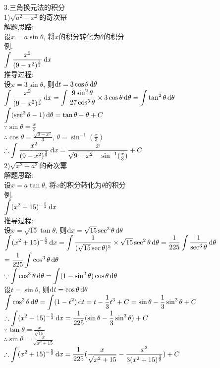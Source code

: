 3.三角换元法的积分\\
1)$\sqrt{a^2-x^2}$的奇次幂\\
解题思路:\\
设$x=a\sin\theta$, 将$x$的积分转化为$\theta$的积分\\
例.\\
\phantom{例}$\displaystyle\int\frac{x^2}{(9-x^2)^{\frac{3}{2}}}\mathop{}\!\mathrm{d} x$\\
推导过程:\\
设$x=3\sin\theta$, 则$\mathop{}\!\mathrm{d} t=3\cos\theta\mathop{}\!\mathrm{d}\theta$\\
$\displaystyle\int\frac{x^2}{(9-x^2)^{\frac{3}{2}}}\mathop{}\!\mathrm{d} x=\int\frac{9\sin^2\theta}{27\cos^3\theta}\times3\cos\theta\mathop{}\!\mathrm{d}\theta=\int\tan^2\theta\mathop{}\!\mathrm{d}\theta$\\
$\displaystyle\int(\sec^2\theta-1)\mathop{}\!\mathrm{d}\theta=\tan\theta-\theta+C$\\
$\displaystyle\because\sin\theta=\frac{x}{3}$\\
$\displaystyle\therefore\cos\theta=\frac{\sqrt{9-x^2}}{3}$, $\theta=\sin^{-1}(\frac{x}{3})$\\
$\displaystyle\therefore\int\frac{x^2}{(9-x^2)^{\frac{3}{2}}}\mathop{}\!\mathrm{d} x=\frac{x}{\sqrt{9-x^2}-\sin^{-1}(\frac{x}{3})}+C$\\

2)$\sqrt{x^2+a^2}$的奇次幂\\
解题思路:\\
设$x=a\tan\theta$, 将$x$的积分转化为$\theta$的积分\\
例.\\
\phantom{例}$\displaystyle\int(x^2+15)^{-\frac{5}{2}}\mathop{}\!\mathrm{d} x$\\
推导过程:\\
设$x=\sqrt{15}\tan\theta$, 则$\mathop{}\!\mathrm{d} x=\sqrt{15}\sec^2\theta\mathop{}\!\mathrm{d}\theta$\\
$\displaystyle\int(x^2+15)^{-\frac{5}{2}}\mathop{}\!\mathrm{d} x=\int\frac{1}{(\sqrt{15}\sec\theta)^5}\times\sqrt{15}\sec^2\theta\mathop{}\!\mathrm{d}\theta=\frac{1}{225}\int\frac{1}{\sec^3\theta}\mathop{}\!\mathrm{d}\theta$\\
$\displaystyle=\frac{1}{225}\int\cos^3\theta\mathop{}\!\mathrm{d}\theta$\\
$\displaystyle\because\int\cos^3\theta\mathop{}\!\mathrm{d}\theta=\int(1-\sin^2\theta)\cos\theta\mathop{}\!\mathrm{d}\theta$\\
\phantom{$\displaystyle\because$}设$t=\sin\theta$, 则$\mathop{}\!\mathrm{d} t=\cos\theta\mathop{}\!\mathrm{d}\theta$\\
\phantom{$\displaystyle\because$}$\displaystyle\int\cos^3\theta\mathop{}\!\mathrm{d}\theta=\int(1-t^2)\mathop{}\!\mathrm{d} t=t-\frac{1}{3}t^3+C=\sin\theta-\frac{1}{3}\sin^3\theta+C$\\
$\displaystyle\therefore\int(x^2+15)^{-\frac{5}{2}}\mathop{}\!\mathrm{d} x=\frac{1}{225}(\sin\theta-\frac{1}{3}\sin^3\theta)+C$\\
$\displaystyle\because\tan\theta=\frac{x}{\sqrt{15}}$\\
$\displaystyle\therefore\sin\theta=\frac{x}{\sqrt{x^2+15}}$\\
$\displaystyle\therefore\int(x^2+15)^{-\frac{5}{2}}\mathop{}\!\mathrm{d} x=\frac{1}{225}(\frac{x}{\sqrt{x^2+15}}-\frac{x^3}{3(x^2+15)^{\frac{3}{2}}})+C$\\

